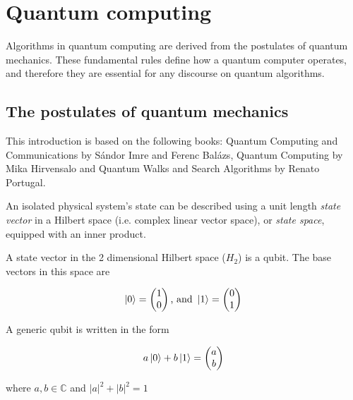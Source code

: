 \chapter{Quantum computing}

Algorithms in quantum computing are derived from the postulates of quantum mechanics. These fundamental rules define how a quantum computer operates, and therefore they are essential for any discourse on quantum algorithms.

\section{The postulates of quantum mechanics}

This introduction is based on the following books: Quantum Computing and Communications\cite{ImreSandor} by Sándor Imre and Ferenc Balázs, Quantum Computing\cite{Hirvensalo} by Mika Hirvensalo and Quantum Walks and Search Algorithms\cite{Portugal} by Renato Portugal.


An isolated physical system's state can be described using a unit length \textit{state vector} in a Hilbert space (i.e. complex linear vector space), or \textit{state space}, equipped with an inner product.

\begin{definition}[Qubit]
A state vector in the 2 dimensional Hilbert space ($H_2$) is a qubit. The base vectors in this space are
\end{definition}

\begin{align*}
\ket{0} = \begin{pmatrix} 1 \\ 0 \end{pmatrix} \text{, and } \ket{1} = \begin{pmatrix} 0 \\ 1 \end{pmatrix}
\end{align*}

A generic qubit is written in the form

\begin{align*}
a\ket{0} + b\ket{1} = \begin{pmatrix} a \\ b \end{pmatrix}
\end{align*}

where $a, b \in{} \mathds{C}$ and $|a|^2 + |b|^2 = 1$

